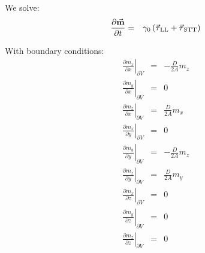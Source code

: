 \documentclass[12pt]{article}
\newcommand{\vc}[1]{\ensuremath{\vec{\textbf{#1}}}}
\newcommand{\m}{\vc{m}}
\newcommand{\tq}[1]{\vc{\ensuremath{\tau}}\ensuremath{_\mathrm{#1}}}
\begin{document}
\pagestyle{empty}

We solve:
\begin{eqnarray*}
	\frac{\partial \m}{\partial t} &=& \gamma_0 \left( \tq{LL} + \tq{STT} \right)
\end{eqnarray*}

\vspace{3cm}

With boundary conditions:
\begin{eqnarray*}
 \left.\frac{\partial m_x}{\partial x}\right|_{\partial V} &=& -\frac{D}{2A}m_z \\
 \left.\frac{\partial m_y}{\partial x}\right|_{\partial V} &=&  0\\
 \left.\frac{\partial m_z}{\partial x}\right|_{\partial V} &=& \frac{D}{2A}m_x\\
 \left.\frac{\partial m_x}{\partial y}\right|_{\partial V} &=&  0\\
 \left.\frac{\partial m_y}{\partial y}\right|_{\partial V} &=&  -\frac{D}{2A}m_z \\
 \left.\frac{\partial m_z}{\partial y}\right|_{\partial V} &=&  \frac{D}{2A}m_y\\
 \left.\frac{\partial m_x}{\partial z}\right|_{\partial V} &=&  0\\
 \left.\frac{\partial m_y}{\partial z}\right|_{\partial V} &=&  0\\
 \left.\frac{\partial m_z}{\partial z}\right|_{\partial V} &=&  0\\
\end{eqnarray*}
\end{document}
